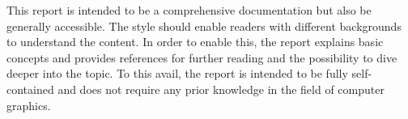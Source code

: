 
This report is intended to be a comprehensive documentation but also be generally accessible. The style should enable readers with different backgrounds to understand the content. In order to enable this, the report explains basic concepts and provides references for further reading and the possibility to dive deeper into the topic. To this avail, the report is intended to be fully self-contained and does not require any prior knowledge in the field of computer graphics.
